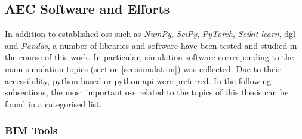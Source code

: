 \documentclass[a4paper, 12pt]{report}
\begin{document}
\subsection{AEC Software and Efforts}\label{subsec:aec-software-and-efforts}

In addition to established \acrshort{oss} such as \textit{NumPy}, \textit{SciPy}, \textit{PyTorch}, \textit{Scikit-learn}, \acrshort{dgl} and \textit{Pandas}, a number of libraries and software have been tested and studied in the course of this work. In particular, simulation software corresponding to the main simulation topics (section \ref{sec:simulation}) was collected. Due to their accessibility, \Gls{python}-based or \Gls{python} \acrshort{api} were preferred. In the following subsections, the most important \acrshort{oss} related to the topics of this thesis can be found in a categorised list.

\subsubsection{BIM Tools}\label{subsec:bim-tools}
\end{document}
